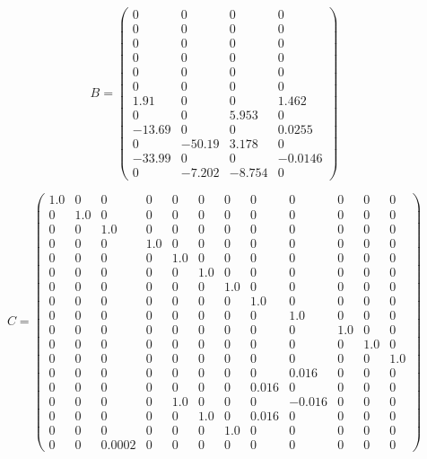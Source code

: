\documentclass{article}
\begin{document}
\begin{dmath}
B = \left(\begin{array}{cccc} 0 & 0 & 0 & 0\\ 0 & 0 & 0 & 0\\ 0 & 0 & 0 & 0\\ 0 & 0 & 0 & 0\\ 0 & 0 & 0 & 0\\ 0 & 0 & 0 & 0\\ 1.91 & 0 & 0 & 1.462\\ 0 & 0 & 5.953 & 0\\ -13.69 & 0 & 0 & 0.0255\\ 0 & -50.19 & 3.178 & 0\\ -33.99 & 0 & 0 & -0.0146\\ 0 & -7.202 & -8.754 & 0 \end{array}\right)
\end{dmath}

\begin{dmath}
C = \left(\begin{array}{cccccccccccc} 1.0 & 0 & 0 & 0 & 0 & 0 & 0 & 0 & 0 & 0 & 0 & 0\\ 0 & 1.0 & 0 & 0 & 0 & 0 & 0 & 0 & 0 & 0 & 0 & 0\\ 0 & 0 & 1.0 & 0 & 0 & 0 & 0 & 0 & 0 & 0 & 0 & 0\\ 0 & 0 & 0 & 1.0 & 0 & 0 & 0 & 0 & 0 & 0 & 0 & 0\\ 0 & 0 & 0 & 0 & 1.0 & 0 & 0 & 0 & 0 & 0 & 0 & 0\\ 0 & 0 & 0 & 0 & 0 & 1.0 & 0 & 0 & 0 & 0 & 0 & 0\\ 0 & 0 & 0 & 0 & 0 & 0 & 1.0 & 0 & 0 & 0 & 0 & 0\\ 0 & 0 & 0 & 0 & 0 & 0 & 0 & 1.0 & 0 & 0 & 0 & 0\\ 0 & 0 & 0 & 0 & 0 & 0 & 0 & 0 & 1.0 & 0 & 0 & 0\\ 0 & 0 & 0 & 0 & 0 & 0 & 0 & 0 & 0 & 1.0 & 0 & 0\\ 0 & 0 & 0 & 0 & 0 & 0 & 0 & 0 & 0 & 0 & 1.0 & 0\\ 0 & 0 & 0 & 0 & 0 & 0 & 0 & 0 & 0 & 0 & 0 & 1.0\\ 0 & 0 & 0 & 0 & 0 & 0 & 0 & 0 & 0.016 & 0 & 0 & 0\\ 0 & 0 & 0 & 0 & 0 & 0 & 0 & 0.016 & 0 & 0 & 0 & 0\\ 0 & 0 & 0 & 0 & 1.0 & 0 & 0 & 0 & -0.016 & 0 & 0 & 0\\ 0 & 0 & 0 & 0 & 0 & 1.0 & 0 & 0.016 & 0 & 0 & 0 & 0\\ 0 & 0 & 0 & 0 & 0 & 0 & 1.0 & 0 & 0 & 0 & 0 & 0\\ 0 & 0 & 0.0002 & 0 & 0 & 0 & 0 & 0 & 0 & 0 & 0 & 0 \end{array}\right)
\end{dmath}
\end{document}
